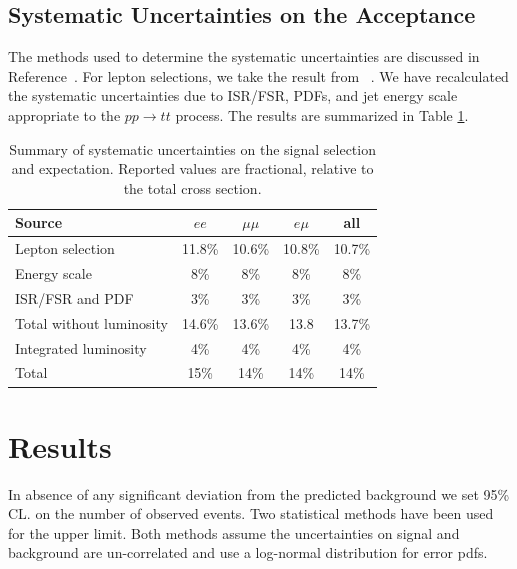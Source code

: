 
\subsection{Systematic Uncertainties on the Acceptance}
\label{sec:sssystematics}

The methods used to determine the systematic uncertainties are discussed in Reference~\cite{ssnote1}.
For lepton selections, we take the result from ~\cite{ssnote1}.
We have recalculated the systematic uncertainties due to ISR/FSR, PDFs, and jet energy scale
appropriate to the $pp \to tt$ process.  The results are 
summarized 
in Table \ref{tab:systSumm}.

\begin{table}[h]
\begin{center}
\begin{tabular}{lcccc}\hline
Source 					& $ee$		& $\mu\mu$		& $e\mu$			& all \\ \hline
Lepton selection			& 11.8\%		& 10.6\%		& 10.8\%			& 10.7\% \\
Energy scale				& 8\%		& 8\%		& 8\%			& 8\% \\
ISR/FSR and PDF				& 3\%		& 3\%		& 3\%			& 3\% 	\\
Total without luminosity		& 14.6\%		& 13.6\%		& 13.8	& 13.7\%	\\ \hline
Integrated luminosity			& 4\%		& 4\%		& 4\%			& 4\%	\\ \hline
Total & 15\% & 14\% & 14\%  & 14\% \\
\hline
\end{tabular}
\caption{\small\label{tab:systSumm}Summary of systematic uncertainties on the signal selection and
expectation. Reported values are fractional, relative to the total cross section.}
\end{center}
\end{table}

\section{Results}
\label{sec:ssresults}

In absence of any significant deviation from the predicted background we set 95\% CL. on the number of observed events. 
Two statistical methods have been used for the upper limit. 
Both methods assume the uncertainties on signal and background are un-correlated and use a log-normal distribution for error pdfs. 

